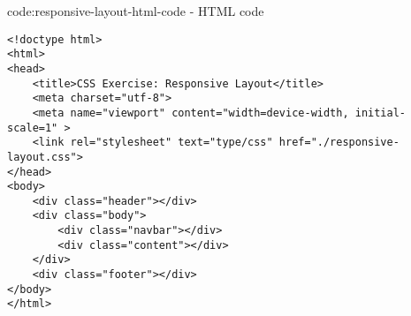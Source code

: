 \begin{codeenv}{code:responsive-layout-html-code}{ - HTML code}
\begin{verbatim}
<!doctype html>
<html>
<head>
    <title>CSS Exercise: Responsive Layout</title>
    <meta charset="utf-8">
    <meta name="viewport" content="width=device-width, initial-scale=1" >
    <link rel="stylesheet" text="type/css" href="./responsive-layout.css">
</head>
<body>
    <div class="header"></div>
    <div class="body">
        <div class="navbar"></div>
        <div class="content"></div>
    </div>
    <div class="footer"></div>
</body>
</html>
\end{verbatim}
\end{codeenv}
